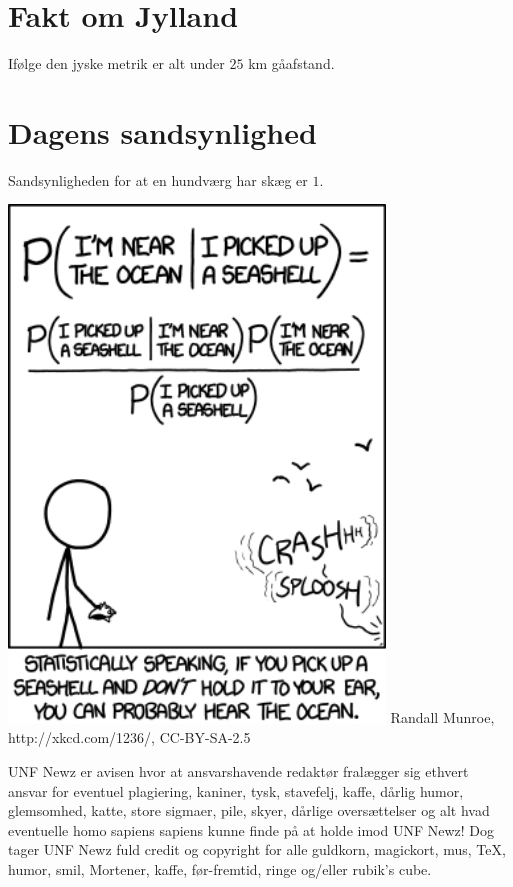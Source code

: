 \begin{minipage}[b]{0.95\linewidth}
\begin{minipage}[t]{0.47\textwidth}
\vspace{-1mm}
\section*{Fakt om Jylland}
Ifølge den jyske metrik er alt under $25$ km gåafstand.

\vspace{-1mm}
\section*{Dagens sandsynlighed}
Sandsynligheden for at en hundværg har skæg er $1$.

\vspace{1mm}
\includegraphics[width=100mm]{seashell.png}
\tiny Randall Munroe, http://xkcd.com/1236/, CC-BY-SA-2.5
\end{minipage}

\begin{center}
\tiny UNF Newz er avisen hvor at ansvarshavende redaktør fralægger sig ethvert ansvar for eventuel plagiering, kaniner, tysk, stavefelj, kaffe, dårlig humor, glemsomhed, katte, store sigmaer, pile, skyer, dårlige oversættelser og alt hvad eventuelle homo sapiens sapiens kunne finde på at holde imod UNF Newz! Dog tager UNF Newz fuld credit og copyright for alle guldkorn, magickort, mus, \TeX, humor, smil, Mortener, kaffe, før-fremtid, ringe og/eller rubik's cube.
\end{center}
\end{minipage}

